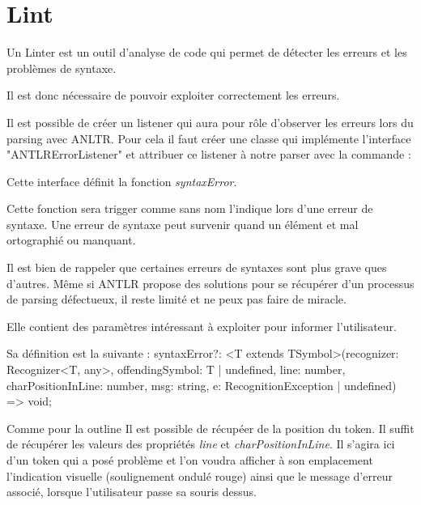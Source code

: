 \documentclass[
    iict, %
    il, %
]{heig-tb}
\begin{document}



\section{Lint}
Un Linter est un outil d'analyse de code qui permet de détecter les erreurs et les problèmes de syntaxe.

Il est donc nécessaire de pouvoir exploiter correctement les erreurs.

Il est possible de créer un listener qui aura pour rôle d'observer les erreurs lors du parsing avec ANLTR.
Pour cela il faut créer une classe qui implémente l'interface "ANTLRErrorListener" et attribuer ce listener à notre parser
avec la commande :

Cette interface définit la fonction \emph{syntaxError}.

Cette fonction sera trigger comme sans nom l'indique lors d'une erreur de syntaxe.
Une erreur de syntaxe peut survenir quand un élément et mal ortographié ou manquant.

Il est bien de rappeler que certaines erreurs de syntaxes sont plus grave ques d'autres.
Même si ANTLR propose des solutions pour se récupérer d'un processus de parsing défectueux, il reste limité et ne peux pas faire de miracle.

Elle contient des paramètres intéressant à exploiter pour informer l'utilisateur.

Sa définition est la suivante :
syntaxError?: <T extends TSymbol>(recognizer: Recognizer<T, any>, offendingSymbol: T | undefined, line: number, charPositionInLine: number, msg: string, e: RecognitionException | undefined) => void;


Comme pour la outline %
Il est possible de récupéer de la position du token. Il suffit de récupérer les valeurs des propriétés \emph{line} et \emph{charPositionInLine}.
Il s'agira ici d'un token qui a posé problème et l'on voudra afficher à son emplacement l'indication visuelle (soulignement ondulé rouge) ainsi que le message d'erreur associé, lorsque l'utilisateur passe
sa souris dessus.
\end{document}
